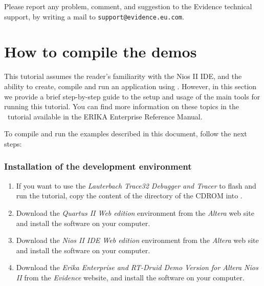 Please report any problem, comment, and suggestion to the Evidence
technical support, by writing a mail to {\tt support@evidence.eu.com}.



\section{How to compile the demos}

This tutorial assumes the reader's familiarity with the Nios II IDE,
and the ability to create, compile and run an application using \ee.
However, in this section we provide a brief step-by-step guide to the setup and
usage of the main tools for running this tutorial.
You can find more information on these topics in the \ee\ tutorial available in
the ERIKA Enterprise Reference Manual.



To compile and run the examples described in this document, follow the next steps:
\subsubsection{Installation of the development environment}
\begin{enumerate}
\item If you want to use the {\em Lauterbach Trace32 Debugger and Tracer}
\cite{Lauterbach} to flash and run the tutorial, copy the content
of the  directory of the CDROM into
.
\item Download the {\em Quartus II Web edition} environment from the {\em Altera} web site and
install the software on your computer.
\item Download the {\em Nios II IDE Web edition} environment from the {\em Altera} web site and
install the software on your computer.
\item Download the {\em Erika Enterprise and RT-Druid Demo Version for Altera Nios II}
from the {\em Evidence} website, and install the software on your computer.
\end{enumerate}


